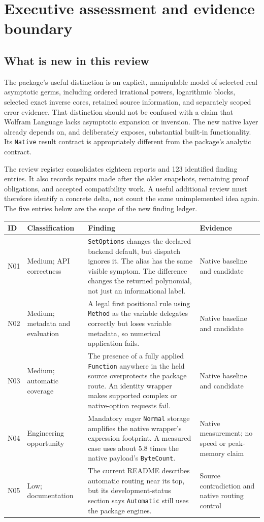 \documentclass[11pt]{article}
\newcommand{\code}[1]{\texttt{#1}}
\begin{document}
\section{Executive assessment and evidence boundary}
\label{sec:scope}
\subsection{What is new in this review}
The package's useful distinction is an explicit, manipulable model of selected real asymptotic germs, including ordered irrational powers, logarithmic blocks, selected exact inverse cores, retained source information, and separately scoped error evidence. That distinction should not be confused with a claim that Wolfram Language lacks asymptotic expansion or inversion. The new native layer already depends on, and deliberately exposes, substantial built-in functionality. Its \code{Native} result contract is appropriately different from the package's analytic contract.\cite{readme,bridge,contracts}

The review register consolidates eighteen reports and 123 identified finding entries. It also records repairs made after the older snapshots, remaining proof obligations, and accepted compatibility work. A useful additional review must therefore identify a concrete delta, not count the same unimplemented idea again. The five entries below are the scope of the new finding ledger.\cite{register,index}

\begin{longtable}{@{}P{0.65cm}P{2.25cm}P{9.5cm}P{2.4cm}@{}}
\toprule
ID & Classification & Finding & Evidence\\ \midrule
\endhead
N01 & Medium; API correctness & \code{SetOptions} changes the declared backend default, but dispatch ignores it. The alias has the same visible symptom. The difference changes the returned polynomial, not just an informational label. & Native baseline and candidate\\[0.5em]
N02 & Medium; metadata and evaluation & A legal first positional rule using \code{Method} as the variable delegates correctly but loses variable metadata, so numerical application fails. & Native baseline and candidate\\[0.5em]
N03 & Medium; automatic coverage & The presence of a fully applied \code{Function} anywhere in the held source overprotects the package route. An identity wrapper makes supported complex or native-option requests fail. & Native baseline and candidate\\[0.5em]
N04 & Engineering opportunity & Mandatory eager \code{Normal} storage amplifies the native wrapper's expression footprint. A measured case uses about 5.8 times the native payload's \code{ByteCount}. & Native measurement; no speed or peak-memory claim\\[0.5em]
N05 & Low; documentation & The current README describes automatic routing near its top, but its development-status section says \code{Automatic} still uses the package engines. & Source contradiction and native routing control\\
\bottomrule
\end{longtable}
\end{document}
